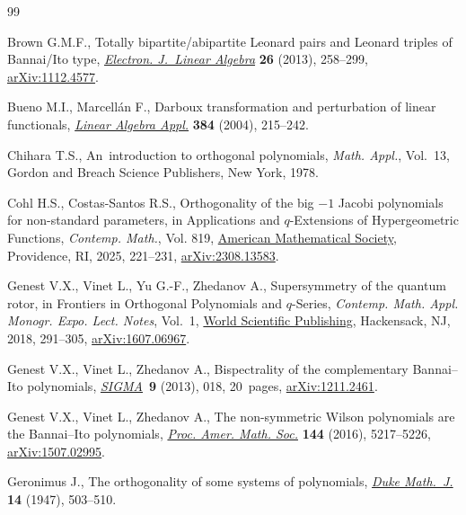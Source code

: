\begin{thebibliography}{99}
\footnotesize\itemsep=0pt

Brown G.M.F., Totally bipartite/abipartite {L}eonard pairs and {L}eonard
 triples of {B}annai/{I}to type,
 \href{https://doi.org/10.13001/1081-3810.1654}{\textit{Electron. J.~Linear
 Algebra}} \textbf{26} (2013), 258--299,
 \href{http://arxiv.org/abs/1112.4577}{arXiv:1112.4577}.

Bueno M.I., Marcell\'an F., Darboux transformation and perturbation of linear
 functionals, \href{https://doi.org/10.1016/j.laa.2004.02.004}{\textit{Linear
 Algebra Appl.}} \textbf{384} (2004), 215--242.

Chihara T.S., An~introduction to orthogonal polynomials, \textit{Math. Appl.},
 Vol.~13, Gordon and Breach Science Publishers, New York, 1978.

Cohl H.S., Costas-Santos R.S., Orthogonality of the big {$-1$} {J}acobi
 polynomials for non-standard parameters, in Applications and {$q$}-Extensions
 of Hypergeometric Functions, \textit{Contemp. Math.}, Vol. 819,
 \href{https://doi.org/10.1090/conm/819/16395}{American Mathematical Society},
 Providence, RI, 2025, 221--231,
 \href{http://arxiv.org/abs/2308.13583}{arXiv:2308.13583}.

Genest V.X., Vinet L., Yu G.-F., Zhedanov A., Supersymmetry of the quantum
 rotor, in Frontiers in Orthogonal Polynomials and {$q$}-Series,
 \textit{Contemp. Math. Appl. Monogr. Expo. Lect. Notes}, Vol.~1,
 \href{https://doi.org/10.1142/9789813228887_0015}{World Scientific
 Publishing}, Hackensack, NJ, 2018, 291--305,
 \href{http://arxiv.org/abs/1607.06967}{arXiv:1607.06967}.

Genest V.X., Vinet L., Zhedanov A., Bispectrality of the complementary
 {B}annai--{I}to polynomials,
 \href{https://doi.org/10.3842/SIGMA.2013.018}{\textit{SIGMA}}~\textbf{9}
 (2013), 018, 20~pages,
 \href{http://arxiv.org/abs/1211.2461}{arXiv:1211.2461}.

Genest V.X., Vinet L., Zhedanov A., The non-symmetric {W}ilson polynomials are
 the {B}annai--{I}to polynomials,
 \href{https://doi.org/10.1090/proc/13141}{\textit{Proc. Amer. Math. Soc.}}
 \textbf{144} (2016), 5217--5226,
 \href{http://arxiv.org/abs/1507.02995}{arXiv:1507.02995}.

Geronimus J., The orthogonality of some systems of polynomials,
 \href{https://doi.org/10.1215/S0012-7094-47-01441-5}{\textit{Duke Math.~J.}}
 \textbf{14} (1947), 503--510.


\end{thebibliography}
